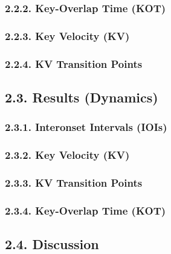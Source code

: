 \documentclass[
  english,
  man,floatsintext]{apa6}
\begin{document}
\hypertarget{key-overlap-time-kot}{%
\subsubsection{2.2.2. Key-Overlap Time (KOT)}\label{key-overlap-time-kot}}

\hypertarget{key-velocity-kv}{%
\subsubsection{2.2.3. Key Velocity (KV)}\label{key-velocity-kv}}

\hypertarget{kv-transition-points}{%
\subsubsection{2.2.4. KV Transition Points}\label{kv-transition-points}}

\hypertarget{results-dynamics}{%
\subsection{2.3. Results (Dynamics)}\label{results-dynamics}}

\hypertarget{interonset-intervals-iois-1}{%
\subsubsection{2.3.1. Interonset Intervals (IOIs)}\label{interonset-intervals-iois-1}}

\hypertarget{key-velocity-kv-1}{%
\subsubsection{2.3.2. Key Velocity (KV)}\label{key-velocity-kv-1}}

\hypertarget{kv-transition-points-1}{%
\subsubsection{2.3.3. KV Transition Points}\label{kv-transition-points-1}}

\hypertarget{key-overlap-time-kot-1}{%
\subsubsection{2.3.4. Key-Overlap Time (KOT)}\label{key-overlap-time-kot-1}}

\hypertarget{discussion}{%
\subsection{2.4. Discussion}\label{discussion}}
\end{document}

